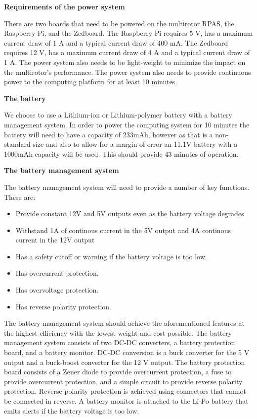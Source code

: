 \textbf{Requirements of the power system}

 There are two boards that need to be powered on the multirotor RPAS, the Raspberry Pi, and the Zedboard. The Raspberry Pi requires
5 V, has a maximum current draw of 1 A and a typical current draw of 400 mA. The Zedboard requires 12 V, has a maximum current draw of
4 A and a typical current draw of 1 A. The power system also
needs to be light-weight to minimize the impact on the multirotor's performance. The power system also needs to provide continuous power to the computing platform for at least 10 minutes.

\textbf{The battery}

We choose to use a Lithium-ion or Lithium-polymer battery with a battery management system. In order to
power the computing system for 10 minutes the battery will need to have a capacity of 233mAh, however as that is a non-standard size and also to allow for a margin of error an 11.1V battery with a 1000mAh capacity will be used. This should provide 43 minutes of operation.

\textbf{The battery management system}

The battery management system will need to provide a number of key functions. These are:
  
  \begin{itemize}
\item Provide constant 12V and 5V outputs even as the battery voltage degrades
\item Withstand 1A of continous current in the 5V output and 4A continous current in the 12V output
\item Has a safety cutoff or warning if the battery voltage is too low.
\item Has overcurrent protection.
\item Has overvoltage protection.
\item Has reverse polarity protection.
\end{itemize}
 
The battery management system should achieve the aforementioned features at the highest efficiency with the lowest weight and cost possible. The battery management system consists of two DC-DC converters, a battery protection board, and a battery monitor. DC-DC conversion is a buck converter for the 5 V output and a buck-boost converter for the 12 V output. The battery protection board consists of a Zener diode to provide overcurrent protection, a fuse to provide overcurrent protection, and a simple circuit to provide reverse polarity protection. Reverse polarity protection is achieved using connectors that cannot be connected in reverse. A battery monitor is attached to the Li-Po battery that emits alerts if the battery voltage is too low.

